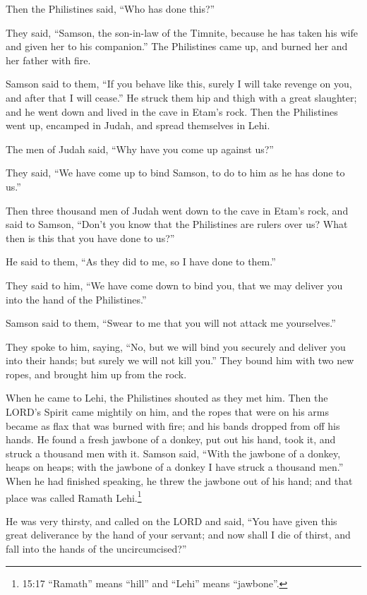 \myverse{}Then the Philistines said, “Who has done this?”

They said, “Samson, the son-in-law of the Timnite, because he has taken his wife and given
her to his companion.” The Philistines came up, and burned her and her father with fire.

\myverse{}Samson said to them, “If you behave like this, surely I will take
revenge on you, and after that I will cease.”
\myverse{}He struck them hip and thigh with a great slaughter; and he went down and lived
in the cave in Etam’s rock.
\myverse{}Then the Philistines went up, encamped in Judah, and spread themselves in Lehi.

\myverse{}The men of Judah said, “Why have you come up against us?”

They said, “We have come up to bind Samson, to do to him as he has done to us.”

\myverse{}Then three thousand men of Judah went down to the cave in Etam’s
rock, and said to Samson, “Don’t you know that the Philistines are rulers over us? What then is this that
you have done to us?”

He said to them, “As they did to me, so I have done to them.”

\myverse{}They said to him, “We have come down to bind you, that we may
deliver you into the hand of the Philistines.”

Samson said to them, “Swear to me that you will not attack me yourselves.”

\myverse{}They spoke to him, saying, “No, but we will bind you securely
and deliver you into their hands; but surely we will not kill you.” They bound him with two new ropes,
and brought him up from the rock.

\myverse{}When he came to Lehi, the Philistines shouted as they met him.
Then the LORD’s Spirit came mightily on him, and the ropes that were on his arms became as flax that was
burned with fire; and his bands dropped from off his hands.
\myverse{}He found a fresh jawbone of a donkey, put out his hand, took it, and struck
a thousand men with it.
\myverse{}Samson said, “With the jawbone of a donkey, heaps on heaps; with the jawbone
of a donkey I have struck a thousand men.”
\myverse{}When he had finished speaking, he threw the jawbone out of his hand; and
that place was called Ramath Lehi.\footnote{15:17 “Ramath” means “hill” and “Lehi” means “jawbone”.}

\myverse{}He was very thirsty, and called on the LORD and said, “You have
given this great deliverance by the hand of your servant; and now shall I die of thirst, and fall into
the hands of the uncircumcised?”

